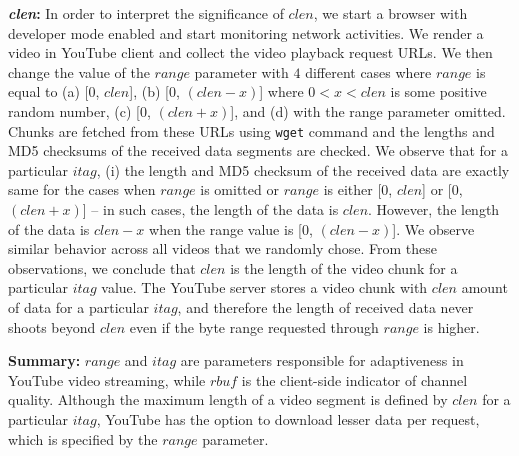 {\bf {\em clen}:} In order to interpret the significance of $clen$, we start a browser with developer mode enabled and start monitoring network activities.
We render a video in YouTube client and collect the video playback request URLs.
We then change the value of the $range$ parameter with $4$ different cases where $range$ is equal to (a) [$0$, $clen$],  (b) [$0$, $(clen-x)$] where $0<x<clen$ is some positive random number, (c) [$0$, $(clen+x)$], and (d) with the range parameter omitted.
Chunks are fetched from these URLs using \texttt{wget} command and the lengths and MD5 checksums of the received data segments are checked.
We observe that for a particular $itag$, (i) the length and MD5 checksum of the received data are exactly same for the cases when  $range$ is omitted or $range$ is either [$0$, $clen$] or [$0$, $(clen+x)$] -- in such cases, the length of the data is $clen$.
However, the length of the data is $clen-x$ when the range value is [$0$, $(clen-x)$].
We observe similar behavior across all videos that we randomly chose.
From these observations, we conclude that $clen$ is the length of the video chunk for a particular $itag$ value.
The YouTube server stores a video chunk with $clen$ amount of data for a particular $itag$, and therefore the length of received data never shoots beyond $clen$ even if the byte range requested through $range$ is higher.

{\bf Summary:} $range$ and $itag$ are parameters responsible for adaptiveness in YouTube video streaming, while $rbuf$ is the client-side indicator of channel quality. 
Although the maximum length of a video segment is defined by $clen$ for a particular $itag$, YouTube has the option to download lesser data per request, which is specified by the $range$ parameter.

